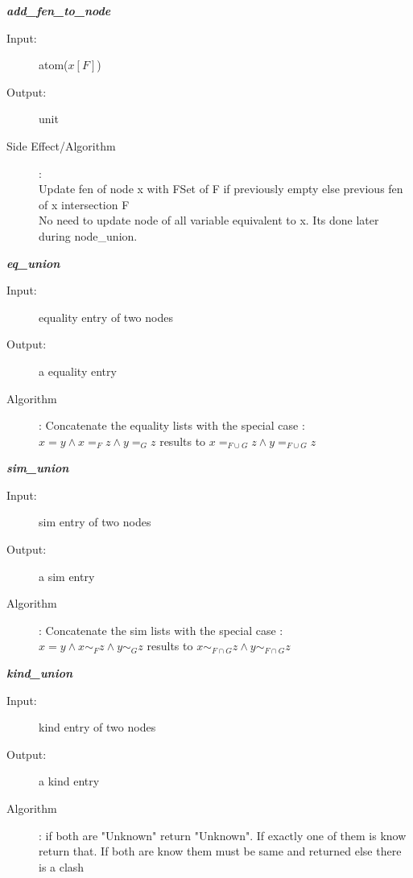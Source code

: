\documentclass[12pt]{article}
\begin{document}
\begin{description}
\item \textbf{\textit{add\_fen\_to\_node}}
\begin{description}
    \item[Input:] atom($x[F]$)
    \item[Output:] unit
    \item[Side Effect/Algorithm]:\\Update fen of node x with FSet of F if previously empty else previous fen of x intersection F\\
	No need to update node of all variable equivalent to x. Its done later during node\_union.\\
\end{description}



\item \textbf{\textit{eq\_union}}
\begin{description}
    \item[Input:] equality entry of two nodes
    \item[Output:] a equality entry
    \item[Algorithm]: Concatenate the equality lists with the special case :\\ $x = y \wedge x =_F z\wedge y =_G z$ results to $x=_{F \cup G} z\wedge y=_{F \cup G} z$\\
\end{description}

\item \textbf{\textit{sim\_union}}
\begin{description}
    \item[Input:] sim entry of two nodes
    \item[Output:] a sim entry
    \item[Algorithm]: Concatenate the sim lists with the special case : \\$x = y \wedge  x \sim_F z \wedge y \sim_G z$ results to $x\sim_{F\cap G}z\wedge y\sim_{F \cap G} z$\\
\end{description}

\item \textbf{\textit{kind\_union}}
\begin{description}
    \item[Input:] kind entry of two nodes
    \item[Output:] a kind entry
    \item[Algorithm]: if both are "Unknown" return "Unknown". If exactly one of them is know return that. If both are know them must be same and returned else there is a clash
\end{description}


\end{description}
\end{document}
